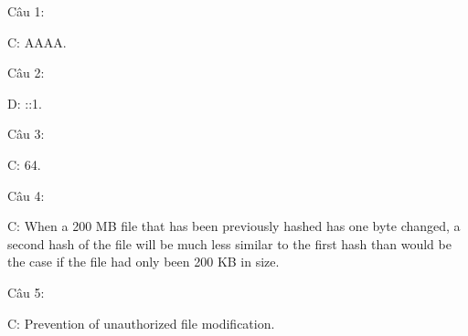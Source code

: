 \noindent Câu 1:

C: AAAA.

\noindent Câu 2: 

D: ::1.

\noindent Câu 3: 

C: 64.

\noindent Câu 4: 

C: When a 200 MB file that has been previously hashed has one byte changed, a second hash of the file will be much less similar to the first hash than would be the case if the file had only been 200 KB in size.

\noindent Câu 5:

C: Prevention of unauthorized file modification.